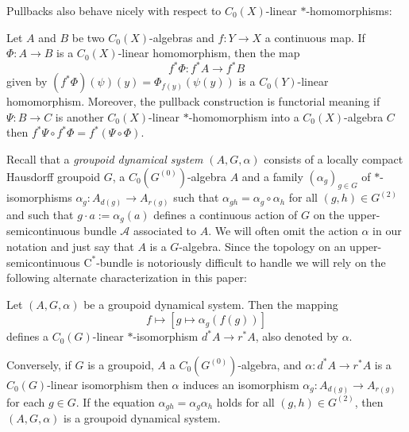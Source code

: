 	Pullbacks also behave nicely with respect to $C_0(X)$-linear $\ast$-homomorphisms:	
	\begin{lemma}\label{Lem:PullbackOfHomomorphisms}
		Let $A$ and $B$ be two $C_0(X)$-algebras and $f:Y\rightarrow X$ a continuous map. If $\Phi:A\rightarrow B$ is a $C_0(X)$-linear homomorphism, then the map
		$$f^*\Phi:f^*A\rightarrow f^*B$$
		given by $(f^*\Phi)(\psi)(y)=\Phi_{f(y)}(\psi(y))$ is a $C_0(Y)$-linear homomorphism.
		Moreover, the pullback construction is functorial meaning if $\Psi:B\rightarrow C$ is another $C_0(X)$-linear $*$-homo\-morphism into a $C_0(X)$-algebra $C$ then $f^*\Psi\circ f^*\Phi=f^*(\Psi\circ \Phi)$.
	\end{lemma}
	
	Recall that a \textit{groupoid dynamical system} $(A,G,\alpha)$ consists of a locally compact Hausdorff groupoid $G$, a $C_0(G^{(0)})$-algebra $A$ and a family $(\alpha_g)_{g\in G}$ of $*$-isomorphisms $\alpha_g:A_{d(g)}\rightarrow A_{r(g)}$ such that $\alpha_{gh}=\alpha_g\circ \alpha_h$ for all $(g,h)\in G^{(2)}$ and such that $g\cdot a:=\alpha_g(a)$ defines a continuous action of $G$ on the upper-semicontinuous bundle $\mathcal{A}$ associated to $A$.	
	We will often omit the action $\alpha$ in our notation and just say that $A$ is a $G$-algebra.
	Since the topology on an upper-semicontinuous $\mathrm{C}^*$-bundle is notoriously difficult to handle we will rely on the following alternate characterization in this paper:
	\begin{lemma}\cite[Lemma~4.3]{MR2547343}
		Let $(A,G,\alpha)$ be a groupoid dynamical system. Then the mapping $$f\mapsto [g\mapsto \alpha_g(f(g))]$$ defines a $C_0(G)$-linear $\ast$-isomorphism $d^*A\rightarrow r^*A$, also denoted by $\alpha$.
		
		Conversely, if $G$ is a groupoid, $A$ a $C_0(G^{(0)})$-algebra, and $\alpha:d^*A\rightarrow r^*A$ is a $C_0(G)$-linear isomorphism then $\alpha$ induces an isomorphism $\alpha_g:A_{d(g)}\rightarrow A_{r(g)}$ for each $g\in G$. If the equation $\alpha_{gh}=\alpha_g\alpha_h$ holds for all $(g,h)\in G^{(2)}$, then $(A,G,\alpha)$ is a groupoid dynamical system.
	\end{lemma}
	
